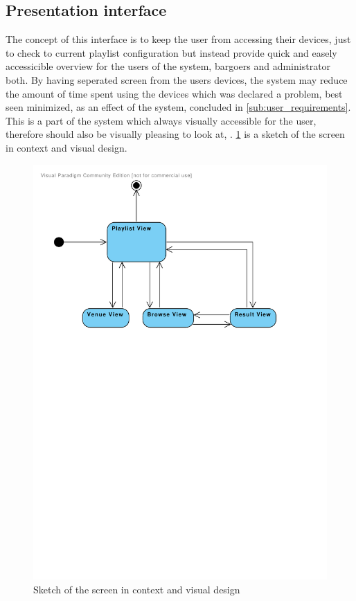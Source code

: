 \subsection{Presentation interface}

The concept of this interface is to keep the user from accessing their devices, just to check to current playlist configuration but instead provide quick and easely accessicible overview for the users of the system, bargoers and administrator both. By having seperated screen from the users devices, the system may reduce the amount of time spent using the devices which was declared a problem, best seen minimized, as an effect of the system, concluded in \cref{sub:user_requirements}. 
This is a part of the system which always visually accessible for the user, therefore should also be visually pleasing to look at, . \cref{fig:PresentationInterface} is a sketch of the screen in context and visual design. 

\begin{figure}[H]
  \centering
  \includegraphics[width=1.0\linewidth]{Images/UserInterface.pdf}
  \caption{Sketch of the screen in context and visual design}\label{fig:PresentationInterface}
\end{figure}